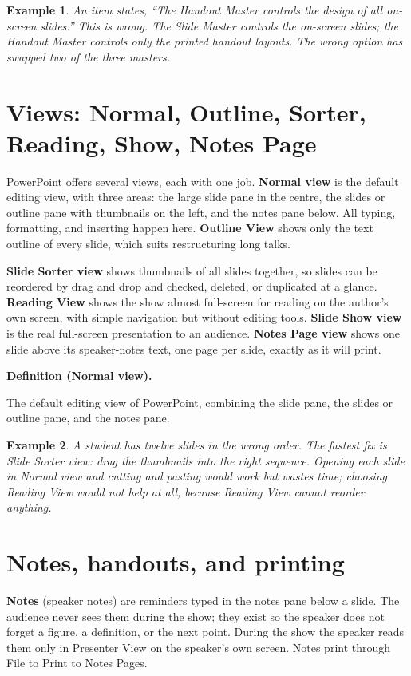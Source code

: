\documentclass[11pt]{article}
\newtheorem{example}{Example}[section]
\newenvironment{definitionbox}[1]{%
  \par\noindent\textbf{Definition (#1).}\ \itshape
}{\par\vspace{0.3em}}
\begin{document}
\begin{example}
An item states, ``The Handout Master controls the design of all on-screen
slides.'' This is wrong. The Slide Master controls the on-screen slides; the
Handout Master controls only the printed handout layouts. The wrong option has
swapped two of the three masters.
\end{example}

\section{Views: Normal, Outline, Sorter, Reading, Show, Notes Page}
PowerPoint offers several views, each with one job. \textbf{Normal view} is
the default editing view, with three areas: the large slide pane in the
centre, the slides or outline pane with thumbnails on the left, and the notes
pane below. All typing, formatting, and inserting happen here. \textbf{Outline
View} shows only the text outline of every slide, which suits restructuring
long talks.

\textbf{Slide Sorter view} shows thumbnails of all slides together, so slides
can be reordered by drag and drop and checked, deleted, or duplicated at a
glance. \textbf{Reading View} shows the show almost full-screen for reading on
the author's own screen, with simple navigation but without editing tools.
\textbf{Slide Show view} is the real full-screen presentation to an audience.
\textbf{Notes Page view} shows one slide above its speaker-notes text, one
page per slide, exactly as it will print.

\begin{definitionbox}{Normal view}
The default editing view of PowerPoint, combining the slide pane, the
slides or outline pane, and the notes pane.
\end{definitionbox}

\begin{example}
A student has twelve slides in the wrong order. The fastest fix is Slide
Sorter view: drag the thumbnails into the right sequence. Opening each slide
in Normal view and cutting and pasting would work but wastes time; choosing
Reading View would not help at all, because Reading View cannot reorder
anything.
\end{example}

\section{Notes, handouts, and printing}
\textbf{Notes} (speaker notes) are reminders typed in the notes pane below a
slide. The audience never sees them during the show; they exist so the speaker
does not forget a figure, a definition, or the next point. During the show the
speaker reads them only in Presenter View on the speaker's own screen. Notes
print through File to Print to Notes Pages.
\end{document}
